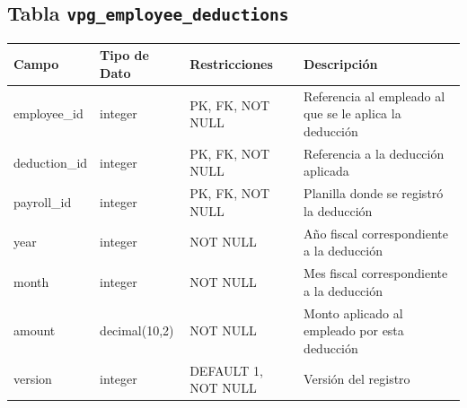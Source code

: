 \begin{center}
	\subsection{Tabla \texttt{vpg\_employee\_deductions}}
	\small
	\begin{tabular}{|l|l|l|p{6cm}|}
		\hline
		\textbf{Campo} & \textbf{Tipo de Dato} & \textbf{Restricciones} & \textbf{Descripción}                                    \\
		\hline
		employee\_id   & integer               & PK, FK, NOT NULL       & Referencia al empleado al que se le aplica la deducción \\
		deduction\_id  & integer               & PK, FK, NOT NULL       & Referencia a la deducción aplicada                      \\
		payroll\_id    & integer               & PK, FK, NOT NULL       & Planilla donde se registró la deducción                 \\
		year           & integer               & NOT NULL               & Año fiscal correspondiente a la deducción               \\
		month          & integer               & NOT NULL               & Mes fiscal correspondiente a la deducción               \\
		amount         & decimal(10,2)         & NOT NULL               & Monto aplicado al empleado por esta deducción           \\
		version        & integer               & DEFAULT 1, NOT NULL    & Versión del registro                                    \\
		\hline
	\end{tabular}
	\normalsize



\end{center}
